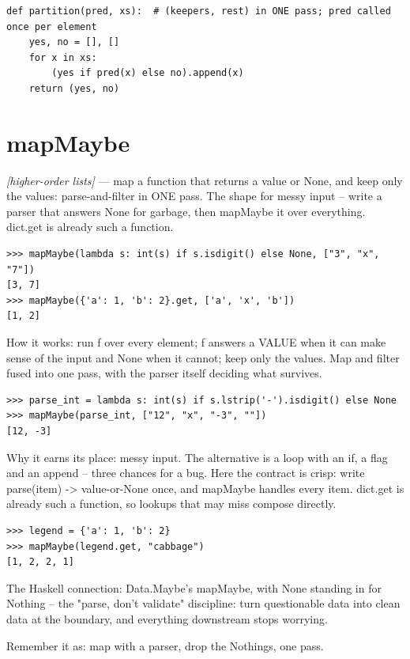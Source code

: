 \documentclass[11pt,letterpaper]{book}
\begin{document}
\begin{lstlisting}[style=code]
def partition(pred, xs):  # (keepers, rest) in ONE pass; pred called once per element
    yes, no = [], []
    for x in xs:
        (yes if pred(x) else no).append(x)
    return (yes, no)
\end{lstlisting}

\section{mapMaybe}
\noindent\textit{[higher-order lists]} --- map a function that returns a value or None, and keep only the values: parse-and-filter in ONE pass. The shape for messy input -- write a parser that answers None for garbage, then mapMaybe it over everything. dict.get is already such a function.
\begin{lstlisting}[style=spec]
>>> mapMaybe(lambda s: int(s) if s.isdigit() else None, ["3", "x", "7"])
[3, 7]
>>> mapMaybe({'a': 1, 'b': 2}.get, ['a', 'x', 'b'])
[1, 2]
\end{lstlisting}

How it works: run f over every element; f answers a VALUE when it can make sense of the input and None when it cannot; keep only the values. Map and filter fused into one pass, with the parser itself deciding what survives.

\begin{lstlisting}[style=spec]
>>> parse_int = lambda s: int(s) if s.lstrip('-').isdigit() else None
>>> mapMaybe(parse_int, ["12", "x", "-3", ""])
[12, -3]
\end{lstlisting}

Why it earns its place: messy input. The alternative is a loop with an if, a flag and an append -- three chances for a bug. Here the contract is crisp: write parse(item) -> value-or-None once, and mapMaybe handles every item. dict.get is already such a function, so lookups that may miss compose directly.

\begin{lstlisting}[style=spec]
>>> legend = {'a': 1, 'b': 2}
>>> mapMaybe(legend.get, "cabbage")
[1, 2, 2, 1]
\end{lstlisting}

The Haskell connection: Data.Maybe's mapMaybe, with None standing in for Nothing -- the "parse, don't validate" discipline: turn questionable data into clean data at the boundary, and everything downstream stops worrying.


Remember it as: map with a parser, drop the Nothings, one pass.
\end{document}
